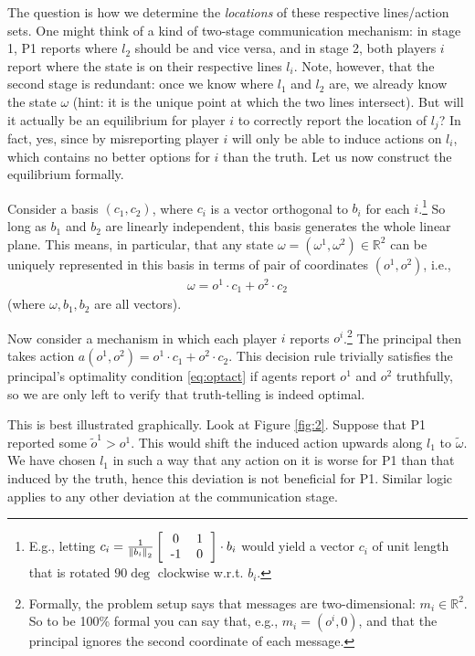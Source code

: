 \documentclass{article}
\begin{document}
The question is how we determine the \emph{locations} of these respective lines/action sets. One might think of a kind of two-stage communication mechanism: in stage 1, P1 reports where $l_2$ should be and vice versa, and in stage 2, both players $i$ report where the state is on their respective lines $l_i$. Note, however, that the second stage is redundant: once we know where $l_1$ and $l_2$ are, we already know the state $\omega$ (hint: it is the unique point at which the two lines intersect). But will it actually be an equilibrium for player $i$ to correctly report the location of $l_j$? In fact, yes, since by misreporting player $i$ will only be able to induce actions on $l_i$, which contains no better options for $i$ than the truth. Let us now construct the equilibrium formally.

Consider a basis $(c_1,c_2)$, where $c_i$ is a vector orthogonal to $b_i$ for each $i$.\footnote{E.g., letting $c_i = \frac{1}{\left\| b_i \right\|_2 } \left[ \begin{tabular}{c c} 0 & 1 \\ -1 & 0 \end{tabular} \right] \cdot b_i$ would yield a vector $c_i$ of unit length that is rotated $90\deg$ clockwise w.r.t. $b_i$.}
So long as $b_1$ and $b_2$ are linearly independent, this basis generates the whole linear plane. This means, in particular, that any state $\omega = (\omega^1, \omega^2) \in \mathbb{R}^2$ can be uniquely represented in this basis in terms of pair of coordinates $(o^1, o^2)$, i.e.,
\begin{align*}
	\omega = o^1 \cdot c_1 + o^2 \cdot c_2
\end{align*}
(where $\omega,b_1,b_2$ are all vectors).

Now consider a mechanism in which each player $i$ reports $o^i$.\footnote{Formally, the problem setup says that messages are two-dimensional: $m_i \in \mathbb{R}^2$. So to be 100\% formal you can say that, e.g., $m_i = (o^i, 0)$, and that the principal ignores the second coordinate of each message.}
The principal then takes action $a(o^1,o^2) = o^1 \cdot c_1 + o^2 \cdot c_2$. This decision rule trivially satisfies the principal's optimality condition \eqref{eq:optact} if agents report $o^1$ and $o^2$ truthfully, so we are only left to verify that truth-telling is indeed optimal.

This is best illustrated graphically. Look at Figure \ref{fig:2}. Suppose that P1 reported some $\tilde{o}^1 > o^1$. This would shift the induced action upwards along $l_1$ to $\tilde{\omega}$. We have chosen $l_1$ in such a way that any action on it is worse for P1 than that induced by the truth, hence this deviation is not beneficial for P1. Similar logic applies to any other deviation at the communication stage.


\end{document}
